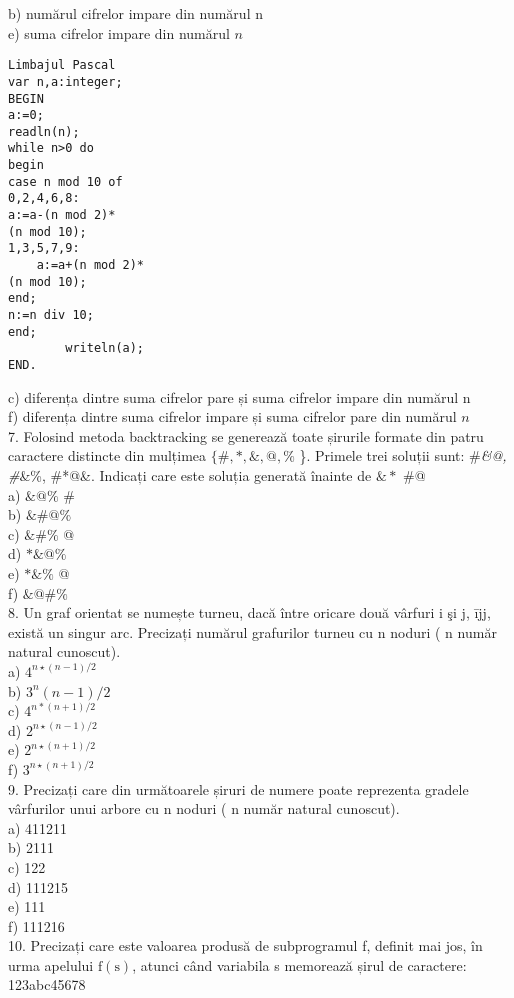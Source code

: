b) numărul cifrelor impare din numărul n\\
e) suma cifrelor impare din numărul $n$

\begin{verbatim}
Limbajul Pascal
var n,a:integer;
BEGIN
a:=0;
readln(n);
while n>0 do
begin
case n mod 10 of
0,2,4,6,8:
a:=a-(n mod 2)*
(n mod 10);
1,3,5,7,9:
    a:=a+(n mod 2)*
(n mod 10);
end;
n:=n div 10;
end;
        writeln(a);
END.
\end{verbatim}

c) diferența dintre suma cifrelor pare și suma cifrelor impare din numărul n\\
f) diferența dintre suma cifrelor impare și suma cifrelor pare din numărul $n$\\
7. Folosind metoda backtracking se generează toate șirurile formate din patru caractere distincte din mulțimea $\{\#, *, \&, @, \%$ \}. Primele trei soluții sunt: \#\textit{\&@, \#}\&\%, \#*@\&. Indicați care este soluția generată înainte de $\& *$ \#@\\
a) $\& @ \%$ \#\\
b) $\& \# @ \%$\\
c) $\& \# \%$ @\\
d) $* \& @ \%$\\
e) $* \& \%$ @\\
f) $\& @ \# \%$\\
8. Un graf orientat se numește turneu, dacă între oricare două vârfuri i şi j, ījj, există un singur arc. Precizați numărul grafurilor turneu cu n noduri ( n număr natural cunoscut).\\
a) $4^{n \star(n-1) / 2}$\\
b) $3^{n}(n-1) / 2$\\
c) $4^{n *(n+1) / 2}$\\
d) $2^{n \star(n-1) / 2}$\\
e) $2^{n \star(n+1) / 2}$\\
f) $3^{n \star(n+1) / 2}$\\
9. Precizați care din următoarele șiruri de numere poate reprezenta gradele vârfurilor unui arbore cu n noduri ( n număr natural cunoscut).\\
a) 411211\\
b) 2111\\
c) 122\\
d) 111215\\
e) 111\\
f) 111216\\
10. Precizați care este valoarea produsă de subprogramul f, definit mai jos, în urma apelului $\mathrm{f}(\mathrm{s})$, atunci când variabila s memorează șirul de caractere: 123abc45678

